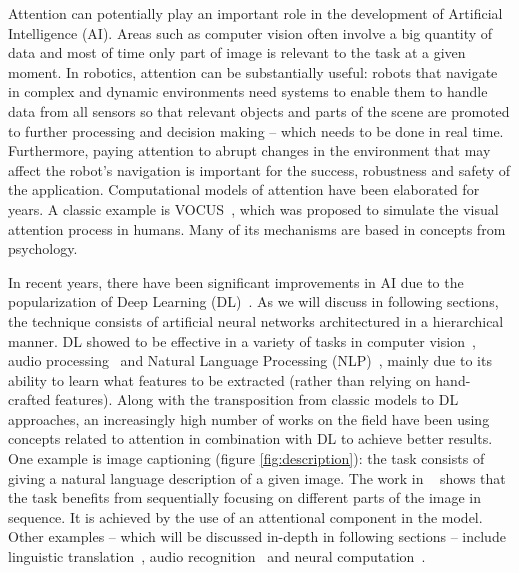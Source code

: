 \documentclass[article]{IEEEtran}
\begin{document}
Attention can potentially play an important role in the development
of Artificial Intelligence (AI).
Areas such as computer vision often involve a big quantity of data
and most of time only part of image is relevant to the task at a given moment.
In robotics, attention can be substantially useful:
robots that navigate in complex and dynamic environments need
systems to enable them to handle data from all sensors
so that relevant objects and parts of the scene are promoted to
further processing and decision making -- which needs to be done in real time.
Furthermore, paying attention to abrupt changes in the environment
that may affect the robot's navigation is important for
the success, robustness and safety of the application.
Computational models of attention have been elaborated for years.
A classic example is VOCUS~\cite{ref:vocus}, which was proposed to
simulate the visual attention process in humans.
Many of its mechanisms are based in concepts from psychology.

In recent years, there have been significant improvements in
AI due to the popularization of Deep Learning (DL)~\cite{ref:dl}.
As we will discuss in following sections, the technique consists of
artificial neural networks architectured in a hierarchical manner.
DL showed to be effective in a variety of tasks in
computer vision~\cite{ref:imagenet}\cite{ref:segmentation},
audio processing~\cite{ref:wavenet} and Natural Language
Processing (NLP)~\cite{ref:att-all-you-need}, mainly due to its ability
to learn what features to be extracted (rather than relying on hand-crafted
features).
Along with the transposition from classic models to DL
approaches, an increasingly high number of works on the field
have been using concepts related to attention in combination with DL
to achieve better results.
One example is image captioning (figure \ref{fig:description}): the task
consists of giving a natural language description of a given image.
The work in ~\cite{ref:img-captioning} shows that the task benefits from
sequentially focusing on different parts of the image in sequence.
It is achieved by the use of an attentional component in the model.
Other examples -- which will be discussed in-depth in following sections --
include linguistic translation~\cite{ref:translation},
audio recognition~\cite{ref:audio} and neural computation~\cite{ref:ntm}.
\end{document}
